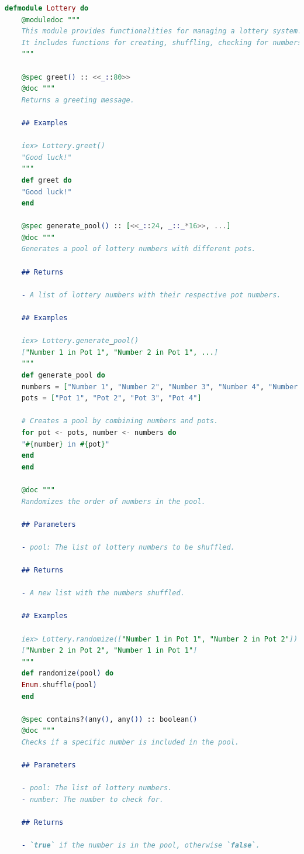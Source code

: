 \begin{lstlisting}[language=elixir, caption={Complete Lottery Module}]
	defmodule Lottery do
	@moduledoc """
	This module provides functionalities for managing a lottery system.
	It includes functions for creating, shuffling, checking for numbers, and distributing numbers within the lottery pool.
	"""
	
	@spec greet() :: <<_::80>>
	@doc """
	Returns a greeting message.
	
	## Examples
	
	iex> Lottery.greet()
	"Good luck!"
	"""
	def greet do
	"Good luck!"
	end
	
	@spec generate_pool() :: [<<_::24, _::_*16>>, ...]
	@doc """
	Generates a pool of lottery numbers with different pots.
	
	## Returns
	
	- A list of lottery numbers with their respective pot numbers.
	
	## Examples
	
	iex> Lottery.generate_pool()
	["Number 1 in Pot 1", "Number 2 in Pot 1", ...]
	"""
	def generate_pool do
	numbers = ["Number 1", "Number 2", "Number 3", "Number 4", "Number 5", "Number 6"]
	pots = ["Pot 1", "Pot 2", "Pot 3", "Pot 4"]
	
	# Creates a pool by combining numbers and pots.
	for pot <- pots, number <- numbers do
	"#{number} in #{pot}"
	end
	end
	
	@doc """
	Randomizes the order of numbers in the pool.
	
	## Parameters
	
	- pool: The list of lottery numbers to be shuffled.
	
	## Returns
	
	- A new list with the numbers shuffled.
	
	## Examples
	
	iex> Lottery.randomize(["Number 1 in Pot 1", "Number 2 in Pot 2"])
	["Number 2 in Pot 2", "Number 1 in Pot 1"]
	"""
	def randomize(pool) do
	Enum.shuffle(pool)
	end
	
	@spec contains?(any(), any()) :: boolean()
	@doc """
	Checks if a specific number is included in the pool.
	
	## Parameters
	
	- pool: The list of lottery numbers.
	- number: The number to check for.
	
	## Returns
	
	- `true` if the number is in the pool, otherwise `false`.
	

\end{lstlisting}
